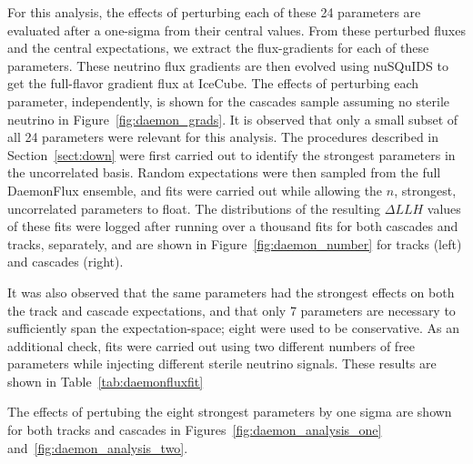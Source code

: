 \documentclass[main.tex]{subfiles}
\begin{document}
For this analysis, the effects of perturbing each of these 24 parameters are evaluated after a one-sigma from their central values.
From these perturbed fluxes and the central expectations, we extract the flux-gradients for each of these parameters.
These neutrino flux gradients are then evolved using nuSQuIDS to get the full-flavor gradient flux at IceCube. 
The effects of perturbing each parameter, independently, is shown for the cascades sample assuming no sterile neutrino in Figure~\ref{fig:daemon_grads}.
It is observed that only a small subset of all 24 parameters were relevant for this analysis. 
The procedures described in Section~\ref{sect:down} were first carried out to identify the strongest parameters in the uncorrelated basis. 
Random expectations were then sampled from the full DaemonFlux ensemble, and fits were carried out while allowing the $n$, strongest, uncorrelated parameters to float. 
The distributions of the resulting $\Delta LLH$ values of these fits were logged after running over a thousand fits for both cascades and tracks, separately, and are shown in Figure~\ref{fig:daemon_number} for tracks (left) and cascades (right). 

It was also observed that the same parameters had the strongest effects on both the track and cascade expectations, and that only 7 parameters are necessary to sufficiently span the expectation-space; eight were used to be conservative. 
As an additional check, fits were carried out using two different numbers of free parameters while injecting different sterile neutrino signals. 
These results are shown in Table~\ref{tab:daemonfluxfit}

The effects of pertubing the eight strongest parameters by one sigma are shown for both tracks and cascades in Figures~\ref{fig:daemon_analysis_one} and~\ref{fig:daemon_analysis_two}.
\end{document}
